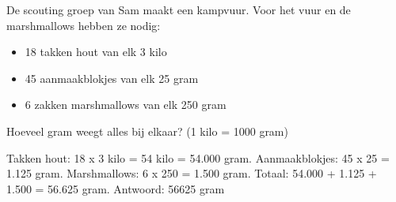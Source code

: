 \begin{opgave}
De scouting groep van Sam maakt een kampvuur. Voor het vuur en de marshmallows hebben ze nodig:

\begin{itemize}
\item 18 takken hout van elk 3 kilo
\item 45 aanmaakblokjes van elk 25 gram  
\item 6 zakken marshmallows van elk 250 gram
\end{itemize}

Hoeveel gram weegt alles bij elkaar? (1 kilo = 1000 gram)
\end{opgave}

\begin{oplossing}
Takken hout: 18 x 3 kilo = 54 kilo = 54.000 gram.
Aanmaakblokjes: 45 x 25 = 1.125 gram.
Marshmallows: 6 x 250 = 1.500 gram.
Totaal: 54.000 + 1.125 + 1.500 = 56.625 gram.
Antwoord: 56625 gram
\end{oplossing}